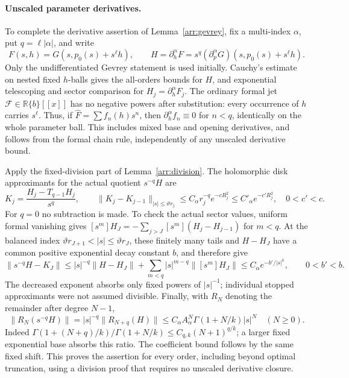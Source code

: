 \paragraph{Unscaled parameter derivatives.}
To complete the derivative assertion of Lemma~\ref{arr:gevrey}, fix
a multi-index \(\alpha\), put \(q=\ell|\alpha|\), and write
\[
 F(s,h)=G(s,p_0(s)+s^\ell h),\qquad
 H=\partial_h^\alpha F
   =s^q(\partial_p^\alpha G)(s,p_0(s)+s^\ell h).
\]
Only the undifferentiated Gevrey statement is used initially.
Cauchy's estimate on nested fixed \(h\)-balls gives the all-orders
bounds for \(H\), and exponential telescoping and sector comparison
for \(H_j=\partial_h^\alpha F_j\).
The ordinary formal jet \(\mathcal F\in\mathbb R\{b\}[[x]]\)
has no negative powers after substitution: every occurrence of
\(h\) carries \(s^\ell\).
Thus, if \(\widehat F=\sum f_n(h)s^n\), then
\(\partial_h^\alpha f_n\equiv0\) for \(n<q\), identically on the
whole parameter ball.  This includes mixed base and opening
derivatives, and follows from the formal chain rule, independently
of any unscaled derivative bound.

Apply the fixed-division part of Lemma~\ref{arr:division}.
The holomorphic disk approximants for the actual quotient \(s^{-q}H\)
are
\[
 K_j=\frac{H_j-T_{q-1}H_j}{s^q},\qquad
 \|K_j-K_{j-1}\|_{|s|\le\vartheta r_j}
       \le C_\alpha r_j^{-q}e^{-cR_j^2}
       \le C'_\alpha e^{-c'R_j^2},\quad 0<c'<c .
\]
For \(q=0\) no subtraction is made.
To check the actual sector values, uniform formal vanishing gives
\([s^m]H_J=-\sum_{j>J}[s^m](H_j-H_{j-1})\) for \(m<q\).
At the balanced index
\(\vartheta r_{J+1}<|s|\le\vartheta r_J\), these finitely many
tails and \(H-H_J\) have a common positive exponential decay
constant \(b\), and therefore give
\[
 \|s^{-q}H-K_J\|
 \le |s|^{-q}\|H-H_J\|
       +\sum_{m<q}|s|^{m-q}\|[s^m]H_J\|
 \le C_\alpha e^{-b'/|s|^k},\qquad 0<b'<b .
\]
The decreased exponent absorbs only fixed powers of \(|s|^{-1}\);
individual stopped approximants were not assumed divisible.
Finally, with \(R_N\) denoting the remainder after degree \(N-1\),
\begin{equation}\label{arr:unscaled-remainder}
 \|R_N(s^{-q}H)\|
 =|s|^{-q}\|R_{N+q}(H)\|
 \le C_\alpha A_\alpha^N\Gamma(1+N/k)|s|^N
 \quad(N\ge0).
\end{equation}
Indeed
\(\Gamma(1+(N+q)/k)/\Gamma(1+N/k)\le C_{q,k}(N+1)^{q/k}\);
a larger fixed exponential base absorbs this ratio.
The coefficient bound follows by the same fixed shift.
This proves the assertion for every order, including beyond optimal
truncation, using a division proof that requires no unscaled
derivative closure.


